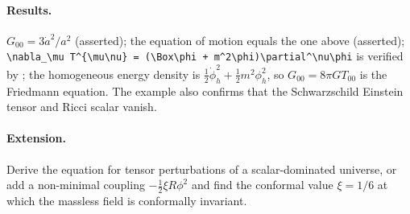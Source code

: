\paragraph{Results.} $G_{00}=3\dot a^2/a^2$ (asserted); the equation of motion equals the one above (asserted); \verb|\nabla_\mu T^{\mu\nu} = (\Box\phi + m^2\phi)\partial^\nu\phi| is verified by ; the homogeneous energy density is $\tfrac12\dot\phi_h^2+\tfrac12m^2\phi_h^2$, so $G_{00}=8\pi GT_{00}$ is the Friedmann equation. The example also confirms that the Schwarzschild Einstein tensor and Ricci scalar vanish.

\paragraph{Extension.} Derive the equation for tensor perturbations of a scalar-dominated universe, or add a non-minimal coupling $-\tfrac12\xi R\phi^2$ and find the conformal value $\xi=1/6$ at which the massless field is conformally invariant.
